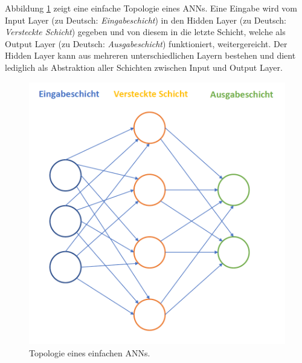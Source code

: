 


Abbildung \ref{fig:basictop} zeigt eine einfache Topologie eines ANNs. Eine Eingabe wird vom Input Layer (zu Deutsch: \textit{Eingabeschicht}) in den Hidden Layer (zu Deutsch: \textit{Versteckte Schicht}) gegeben und von diesem in die letzte Schicht, welche als Output Layer (zu Deutsch: \textit{Ausgabeschicht}) funktioniert, weitergereicht. Der Hidden Layer kann aus mehreren unterschiedlichen Layern bestehen und dient lediglich als Abstraktion aller Schichten zwischen Input und Output Layer.

\begin{figure}[ht]
\centering
\includegraphics[scale=0.5]{pictures/grafiken/Folie3}
\caption[Caption for LOF]{Topologie eines einfachen ANNs.} 
\label{fig:basictop}
\end{figure}

